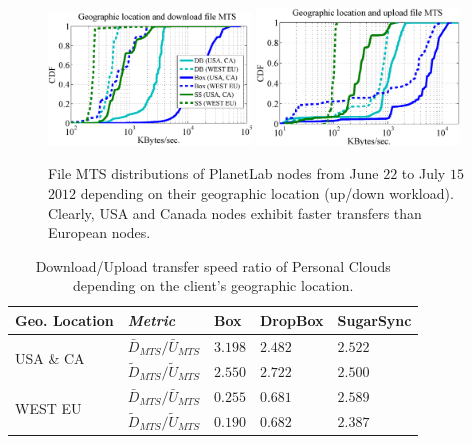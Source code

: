 \begin{figure}[h]
\centering	
{\label{fig:transfer_times_geographic_location_downloads}
\includegraphics[width=0.48\textwidth]{figures/geographic_location_downloads.eps}} 
{\label{fig:transfer_times_geographic_location_uploads}
\includegraphics[width=0.48\textwidth]{figures/geographic_location_uploads.eps}}
	\caption{File MTS distributions of PlanetLab nodes from June $22$ to July $15$ 
	$2012$ depending on their geographic location (up/down workload).
	Clearly, USA and Canada nodes exhibit faster transfers than European nodes.}
	\label{fig:transfer_times_geographic_location}
\end{figure}


\begin{table}[h]
\begin{center}
\begin{tabular}{|l|l|l|l|l|}
\hline
 Geo. Location& \textit{Metric} & Box & DropBox & SugarSync \\ \hline
\multirow{2}{*}{USA \& CA}
 & $\bar{D}_{MTS}/\bar{U}_{MTS}$ & $3.198$ & $2.482$ & $2.522$ \\
 & $\tilde{D}_{MTS}/\tilde{U}_{MTS}$ & $2.550$ & $2.722$ & $2.500$ \\ \hline
\multirow{2}{*}{WEST EU}
 & $\bar{D}_{MTS}/\bar{U}_{MTS}$ & $0.255$ & $0.681$ & $2.589$ \\
 & $\tilde{D}_{MTS}/\tilde{U}_{MTS}$ & $0.190$ & $0.682$ & $2.387$ \\ \hline
\end{tabular}
\caption{Download/Upload transfer speed ratio of Personal Clouds depending on the client's geographic location.}
\vspace{-5mm}
\label{tab:down_up_ratio_location}
\end{center}
\end{table}

